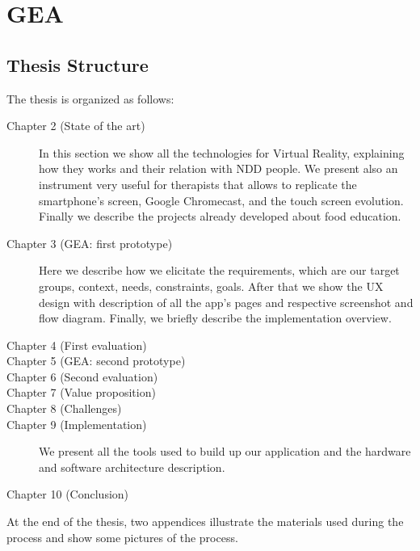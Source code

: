 \section{GEA}
\subsection{Thesis Structure}
The thesis is organized as follows:
\begin{description}
\item[Chapter 2 (State of the art)] In this section we show all the technologies for Virtual Reality, explaining how they works and their relation with NDD people. We present also an instrument very useful for therapists that allows to replicate the smartphone's screen, Google Chromecast, and the touch screen evolution. Finally we describe the projects already developed about food education.
\item[Chapter 3 (GEA: first prototype)] Here we describe how we elicitate the requirements, which are our target groups, context, needs, constraints, goals. After that we show the UX design with description of all the app's pages and respective screenshot and flow diagram. Finally, we briefly describe the implementation overview.
\item[Chapter 4 (First evaluation)]  
\item[Chapter 5 (GEA: second prototype)]
\item[Chapter 6 (Second evaluation)] 
\item[Chapter 7 (Value proposition)]
\item[Chapter 8 (Challenges)]  
\item[Chapter 9 (Implementation)] We present all the tools used to build up our application and the hardware and software architecture description.
\item[Chapter 10 (Conclusion)]
\end{description}
At the end of the thesis, two appendices illustrate the materials used during the process
and show some pictures of the process.
 
